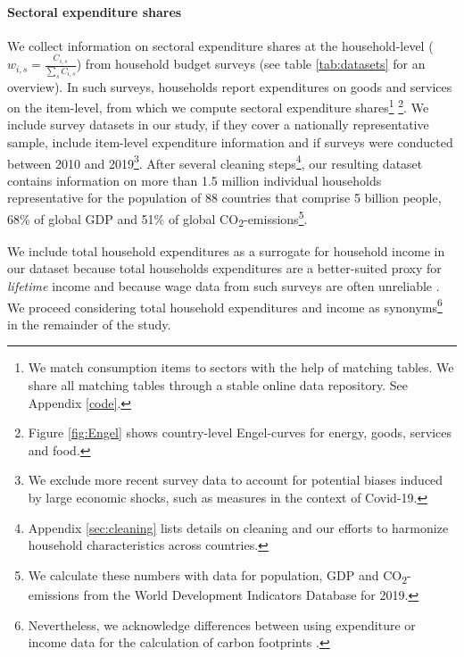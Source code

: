 \documentclass[12pt, a4paper]{article}
\begin{document}
\paragraph{Sectoral expenditure shares} We collect information on sectoral expenditure shares at the household-level ($w_{i,s}=\frac{C_{i,s}}{\sum_{s}C_{i,s}}$) from household budget surveys (see table \ref{tab:datasets} for an overview). In such surveys, households report expenditures on goods and services on the item-level, from which we compute sectoral expenditure shares\footnote{We match consumption items to sectors with the help of matching tables. We share all matching tables through a stable online data repository. See Appendix \ref{code}.} \footnote{Figure \ref{fig:Engel} shows country-level Engel-curves for energy, goods, services and food.}. We include survey datasets in our study, if they cover a nationally representative sample, include item-level expenditure information and if surveys were conducted between 2010 and 2019\footnote{We exclude more recent survey data to account for potential biases induced by large economic shocks, such as measures in the context of Covid-19.}. After several cleaning steps\footnote{Appendix \ref{sec:cleaning} lists details on cleaning and our efforts to harmonize household characteristics across countries.}, our resulting dataset contains information on more than 1.5 million individual households representative for the population of 88 countries that comprise 5 billion people, 68\% of global GDP and 51\% of global CO\textsubscript{2}-emissions\footnote{We calculate these numbers with data for population, GDP and CO\textsubscript{2}-emissions from the World Development Indicators Database \autocite{WorldBankGroup.2023} for 2019.}.

We include total household expenditures as a surrogate for household income in our dataset because total households expenditures are a better-suited proxy for \textit{lifetime} income \autocite{Poterba.1989,Poterba.1991,Cronin.2019} and because wage data from such surveys are often unreliable \autocite{Blundell.1998}. We proceed considering total household expenditures and income as synonyms\footnote{Nevertheless, we acknowledge differences between using expenditure or income data for the calculation of carbon footprints \autocite[see][]{Levay.2023}.} in the remainder of the study.
\end{document}
